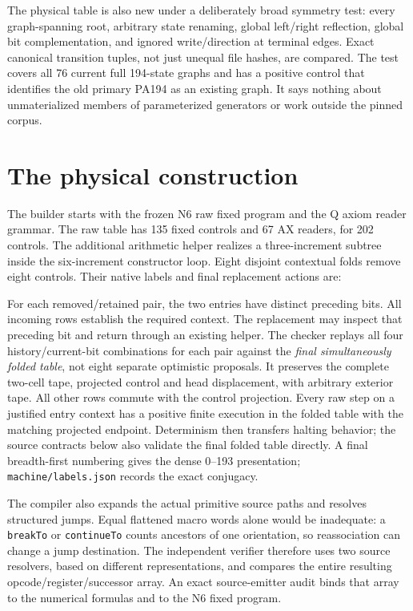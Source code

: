\documentclass[11pt,letterpaper]{article}
\newcommand{\file}[1]{\texttt{\nolinkurl{#1}}}
\begin{document}
The physical table is also
new under a deliberately broad symmetry test: every graph-spanning root,
arbitrary state renaming, global left/right reflection, global bit
complementation, and ignored write/direction at terminal edges. Exact
canonical transition tuples, not just unequal file hashes, are compared.
The test covers all 76 current full 194-state graphs and has a positive
control that identifies the old primary PA194 as an existing graph.
It says nothing about unmaterialized members of parameterized generators
or work outside the pinned corpus.

\section{The physical construction}
\label{sec:construction}

The builder starts with the frozen N6 raw fixed program and the Q axiom
reader grammar. The raw table has 135 fixed controls and 67 AX readers,
for 202 controls. The additional arithmetic helper realizes a three-increment
subtree inside the six-increment constructor loop. Eight disjoint contextual
folds remove eight controls. Their native labels and final replacement
actions are:
\begin{center}\small

\end{center}

For each removed/retained pair, the two entries have distinct preceding
bits. All incoming rows establish the required context. The replacement
may inspect that preceding bit and return through an existing helper.
The checker replays all four history/current-bit combinations for each
pair against the \emph{final simultaneously folded table}, not eight
separate optimistic proposals. It preserves the complete two-cell tape,
projected control and head displacement, with arbitrary exterior tape.
All other rows commute with the control projection. Every raw step on a
justified entry context has a positive finite execution in the folded table
with the matching projected endpoint. Determinism then transfers halting
behavior; the source contracts below also validate the final folded table
directly. A final breadth-first numbering gives the dense
0--193 presentation; \file{machine/labels.json} records the exact conjugacy.

The compiler also expands the actual primitive source paths and resolves
structured jumps. Equal flattened macro words alone would be inadequate:
a \texttt{breakTo} or \texttt{continueTo} counts ancestors of one orientation,
so reassociation can change a jump destination. The independent verifier
therefore uses two source resolvers, based on different representations,
and compares the entire resulting opcode/register/successor array.
An exact source-emitter audit binds that array to the numerical formulas
and to the N6 fixed program.
\end{document}
